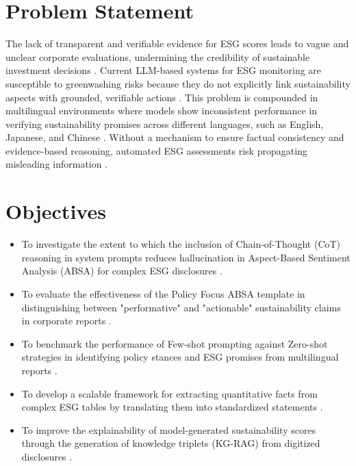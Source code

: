 \documentclass{article}
\begin{document}
\section{Problem Statement}
The lack of transparent and verifiable evidence for ESG scores leads to vague and unclear corporate evaluations, undermining the credibility of sustainable investment decisions \citep{cite_031}. Current LLM-based systems for ESG monitoring are susceptible to greenwashing risks because they do not explicitly link sustainability aspects with grounded, verifiable actions \citep{cite_032}. This problem is compounded in multilingual environments where models show inconsistent performance in verifying sustainability promises across different languages, such as English, Japanese, and Chinese \citep{cite_027}. Without a mechanism to ensure factual consistency and evidence-based reasoning, automated ESG assessments risk propagating misleading information \citep{cite_021, cite_022}.

\section{Objectives}
\begin{itemize}
\item To investigate the extent to which the inclusion of Chain-of-Thought (CoT) reasoning in system prompts reduces hallucination in Aspect-Based Sentiment Analysis (ABSA) for complex ESG disclosures \citep{cite_028}.
\item To evaluate the effectiveness of the Policy Focus ABSA template in distinguishing between "performative" and "actionable" sustainability claims in corporate reports \citep{cite_028}.
\item To benchmark the performance of Few-shot prompting against Zero-shot strategies in identifying policy stances and ESG promises from multilingual reports \citep{cite_028, cite_027}.
\item To develop a scalable framework for extracting quantitative facts from complex ESG tables by translating them into standardized statements \citep{cite_030}.
\item To improve the explainability of model-generated sustainability scores through the generation of knowledge triplets (KG-RAG) from digitized disclosures \citep{cite_028}.
\end{itemize}
\end{document}
